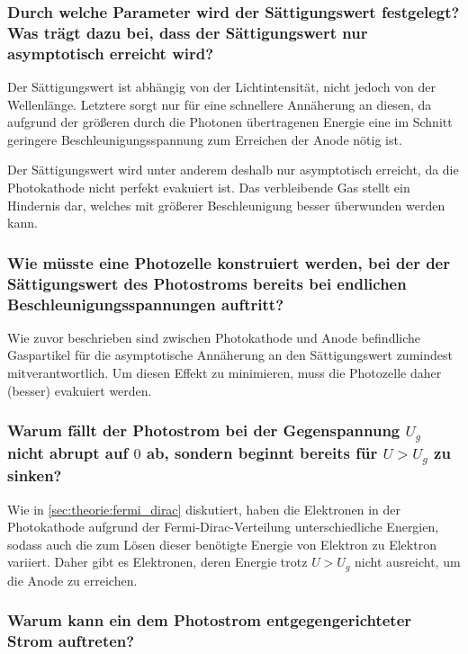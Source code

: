 \subsubsection*{Durch welche Parameter wird der Sättigungswert festgelegt?
Was trägt dazu bei, dass der Sättigungswert nur asymptotisch erreicht wird?}

Der Sättigungswert ist abhängig von der Lichtintensität,
nicht jedoch von der Wellenlänge.
Letztere sorgt nur für eine schnellere Annäherung an diesen,
da aufgrund der größeren durch die Photonen übertragenen Energie
eine im Schnitt geringere Beschleunigungsspannung zum Erreichen der Anode nötig ist.

Der Sättigungswert wird unter anderem deshalb nur asymptotisch erreicht,
da die Photokathode nicht perfekt evakuiert ist.
Das verbleibende Gas stellt ein Hindernis dar,
welches mit größerer Beschleunigung besser überwunden werden kann.

\subsubsection*{Wie müsste eine Photozelle konstruiert werden,
bei der der Sättigungswert des Photostroms bereits bei endlichen Beschleunigungsspannungen auftritt?}

Wie zuvor beschrieben
sind zwischen Photokathode und Anode befindliche Gaspartikel
für die asymptotische Annäherung an den Sättigungswert zumindest mitverantwortlich.
Um diesen Effekt zu minimieren,
muss die Photozelle daher (besser) evakuiert werden.

\subsubsection*{Warum fällt der Photostrom bei der Gegenspannung $U_g$ nicht abrupt auf $0$ ab,
sondern beginnt bereits für $U > U_g$ zu sinken?}

Wie in \autoref{sec:theorie:fermi_dirac} diskutiert,
haben die Elektronen in der Photokathode aufgrund der Fermi-Dirac-Verteilung unterschiedliche Energien,
sodass auch die zum Lösen dieser benötigte Energie von Elektron zu Elektron variiert.
Daher gibt es Elektronen,
deren Energie trotz $U > U_g$ nicht ausreicht,
um die Anode zu erreichen.

\subsubsection*{Warum kann ein dem Photostrom entgegengerichteter Strom auftreten?}


